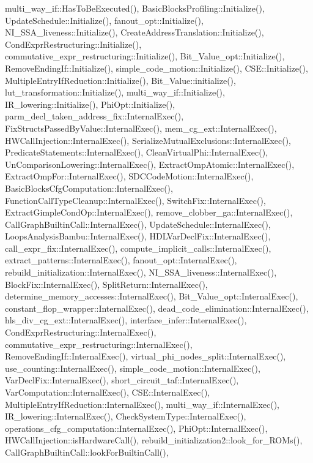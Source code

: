 multi\+\_\+way\+\_\+if\+::\+Has\+To\+Be\+Executed(), Basic\+Blocks\+Profiling\+::\+Initialize(), Update\+Schedule\+::\+Initialize(), fanout\+\_\+opt\+::\+Initialize(), N\+I\+\_\+\+S\+S\+A\+\_\+liveness\+::\+Initialize(), Create\+Address\+Translation\+::\+Initialize(), Cond\+Expr\+Restructuring\+::\+Initialize(), commutative\+\_\+expr\+\_\+restructuring\+::\+Initialize(), Bit\+\_\+\+Value\+\_\+opt\+::\+Initialize(), Remove\+Ending\+If\+::\+Initialize(), simple\+\_\+code\+\_\+motion\+::\+Initialize(), C\+S\+E\+::\+Initialize(), Multiple\+Entry\+If\+Reduction\+::\+Initialize(), Bit\+\_\+\+Value\+::initialize(), lut\+\_\+transformation\+::\+Initialize(), multi\+\_\+way\+\_\+if\+::\+Initialize(), I\+R\+\_\+lowering\+::\+Initialize(), Phi\+Opt\+::\+Initialize(), parm\+\_\+decl\+\_\+taken\+\_\+address\+\_\+fix\+::\+Internal\+Exec(), Fix\+Structs\+Passed\+By\+Value\+::\+Internal\+Exec(), mem\+\_\+cg\+\_\+ext\+::\+Internal\+Exec(), H\+W\+Call\+Injection\+::\+Internal\+Exec(), Serialize\+Mutual\+Exclusions\+::\+Internal\+Exec(), Predicate\+Statements\+::\+Internal\+Exec(), Clean\+Virtual\+Phi\+::\+Internal\+Exec(), Un\+Comparison\+Lowering\+::\+Internal\+Exec(), Extract\+Omp\+Atomic\+::\+Internal\+Exec(), Extract\+Omp\+For\+::\+Internal\+Exec(), S\+D\+C\+Code\+Motion\+::\+Internal\+Exec(), Basic\+Blocks\+Cfg\+Computation\+::\+Internal\+Exec(), Function\+Call\+Type\+Cleanup\+::\+Internal\+Exec(), Switch\+Fix\+::\+Internal\+Exec(), Extract\+Gimple\+Cond\+Op\+::\+Internal\+Exec(), remove\+\_\+clobber\+\_\+ga\+::\+Internal\+Exec(), Call\+Graph\+Builtin\+Call\+::\+Internal\+Exec(), Update\+Schedule\+::\+Internal\+Exec(), Loops\+Analysis\+Bambu\+::\+Internal\+Exec(), H\+D\+L\+Var\+Decl\+Fix\+::\+Internal\+Exec(), call\+\_\+expr\+\_\+fix\+::\+Internal\+Exec(), compute\+\_\+implicit\+\_\+calls\+::\+Internal\+Exec(), extract\+\_\+patterns\+::\+Internal\+Exec(), fanout\+\_\+opt\+::\+Internal\+Exec(), rebuild\+\_\+initialization\+::\+Internal\+Exec(), N\+I\+\_\+\+S\+S\+A\+\_\+liveness\+::\+Internal\+Exec(), Block\+Fix\+::\+Internal\+Exec(), Split\+Return\+::\+Internal\+Exec(), determine\+\_\+memory\+\_\+accesses\+::\+Internal\+Exec(), Bit\+\_\+\+Value\+\_\+opt\+::\+Internal\+Exec(), constant\+\_\+flop\+\_\+wrapper\+::\+Internal\+Exec(), dead\+\_\+code\+\_\+elimination\+::\+Internal\+Exec(), hls\+\_\+div\+\_\+cg\+\_\+ext\+::\+Internal\+Exec(), interface\+\_\+infer\+::\+Internal\+Exec(), Cond\+Expr\+Restructuring\+::\+Internal\+Exec(), commutative\+\_\+expr\+\_\+restructuring\+::\+Internal\+Exec(), Remove\+Ending\+If\+::\+Internal\+Exec(), virtual\+\_\+phi\+\_\+nodes\+\_\+split\+::\+Internal\+Exec(), use\+\_\+counting\+::\+Internal\+Exec(), simple\+\_\+code\+\_\+motion\+::\+Internal\+Exec(), Var\+Decl\+Fix\+::\+Internal\+Exec(), short\+\_\+circuit\+\_\+taf\+::\+Internal\+Exec(), Var\+Computation\+::\+Internal\+Exec(), C\+S\+E\+::\+Internal\+Exec(), Multiple\+Entry\+If\+Reduction\+::\+Internal\+Exec(), multi\+\_\+way\+\_\+if\+::\+Internal\+Exec(), I\+R\+\_\+lowering\+::\+Internal\+Exec(), Check\+System\+Type\+::\+Internal\+Exec(), operations\+\_\+cfg\+\_\+computation\+::\+Internal\+Exec(), Phi\+Opt\+::\+Internal\+Exec(), H\+W\+Call\+Injection\+::is\+Hardware\+Call(), rebuild\+\_\+initialization2\+::look\+\_\+for\+\_\+\+R\+O\+Ms(), Call\+Graph\+Builtin\+Call\+::look\+For\+Builtin\+Call(), 